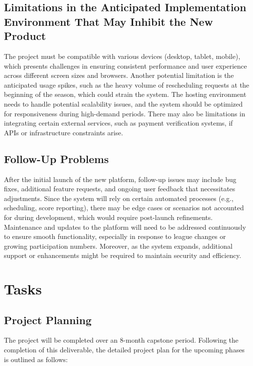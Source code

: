 \documentclass[12pt]{article}
\begin{document}
\subsection{Limitations in the Anticipated Implementation Environment That May
Inhibit the New Product}
The project must be compatible with various devices (desktop, tablet, mobile), which presents challenges in ensuring consistent performance and user experience across different screen sizes and browsers. Another potential limitation is the anticipated usage spikes, such as the heavy volume of rescheduling requests at the beginning of the season, which could strain the system. The hosting environment needs to handle potential scalability issues, and the system should be optimized for responsiveness during high-demand periods. There may also be limitations in integrating certain external services, such as payment verification systems, if APIs or infrastructure constraints arise.
\subsection{Follow-Up Problems}
After the initial launch of the new platform, follow-up issues may include bug fixes, additional feature requests, and ongoing user feedback that necessitates adjustments. Since the system will rely on certain automated processes (e.g., scheduling, score reporting), there may be edge cases or scenarios not accounted for during development, which would require post-launch refinements. Maintenance and updates to the platform will need to be addressed continuously to ensure smooth functionality, especially in response to league changes or growing participation numbers. Moreover, as the system expands, additional support or enhancements might be required to maintain security and efficiency.

\section{Tasks}
\subsection{Project Planning}
The project will be completed over an 8-month capstone period. Following the completion of this deliverable, the detailed project plan for the upcoming phases is outlined as follows:
\end{document}
